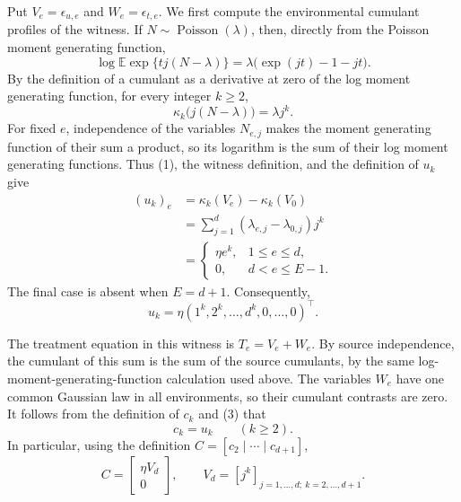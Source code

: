 Put \(V_e=\epsilon_{u,e}\) and \(W_e=\epsilon_{t,e}\).  We first compute the environmental cumulant profiles of the witness.  If \(N\sim\operatorname{Poisson}(\lambda)\), then, directly from the Poisson moment generating function,
\[
 \log \mathbb E\exp\{t j(N-\lambda)\}
 =\lambda\bigl(\exp(jt)-1-jt\bigr).
\]
By the definition of a cumulant as a derivative at zero of the log moment generating function, for every integer \(k\geq2\),
\[
 \kappa_k\bigl(j(N-\lambda)\bigr)=\lambda j^k.                 \tag{1}
\]
For fixed \(e\), independence of the variables \(N_{e,j}\) makes the moment generating function of their sum a product, so its logarithm is the sum of their log moment generating functions.  Thus (1), the witness definition, and the definition of \(u_k\) give
\[
 \begin{aligned}
 (u_k)_e
 &=\kappa_k(V_e)-\kappa_k(V_0)\\
 &=\sum_{j=1}^d(\lambda_{e,j}-\lambda_{0,j})j^k\\
 &=\begin{cases}
      \eta e^k,&1\leq e\leq d,\\
      0,&d<e\leq E-1.
    \end{cases}
 \end{aligned}                                                   \tag{2}
\]
The final case is absent when \(E=d+1\).  Consequently,
\[
 u_k=\eta(1^k,2^k,\ldots,d^k,0,\ldots,0)^\top.                 \tag{3}
\]

The treatment equation in this witness is \(T_e=V_e+W_e\).  By source independence, the cumulant of this sum is the sum of the source cumulants, by the same log-moment-generating-function calculation used above.  The variables \(W_e\) have one common Gaussian law in all environments, so their cumulant contrasts are zero.  It follows from the definition of \(c_k\) and (3) that
\[
 c_k=u_k\qquad(k\geq2).                                         \tag{4}
\]
In particular, using the definition \(C=[c_2\mid\cdots\mid c_{d+1}]\),
\[
 C=\begin{bmatrix}\eta V_d\\[2pt]0\end{bmatrix},
 \qquad
 V_d=[j^k]_{j=1,\ldots,d;\ k=2,\ldots,d+1}.                    \tag{5}
\]

